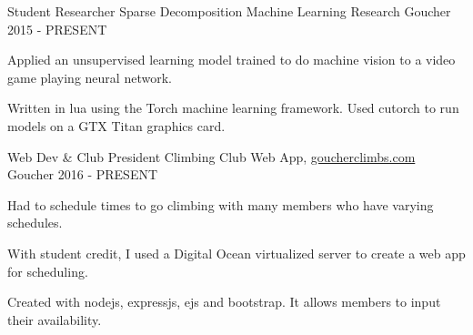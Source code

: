 

\begin{cventries}

  \cventry
    {Student Researcher} %
    {Sparse Decomposition Machine Learning Research} %
    {Goucher} %
    {2015 - PRESENT} %
    {
      \begin{cvitems} %
        \item {Applied an unsupervised learning model trained to do machine vision to a video game playing neural network.}
        \item {Written in lua using the Torch machine learning framework. Used cutorch to run models on a GTX Titan graphics card.}
      \end{cvitems}
    }

  \cventry
    {Web Dev \& Club President} %
    {Climbing Club Web App{\normalfont, \href{http://www.goucherclimbs.com/}{goucherclimbs.com}} } %
    {Goucher} %
    {2016 - PRESENT} %
    {
      \begin{cvitems} %
        \item {Had to schedule times to go climbing with many members who have varying schedules.}
        \item {With student credit, I used a Digital Ocean virtualized server to create a web app for scheduling.}
        \item {Created with nodejs, expressjs, ejs and bootstrap. It allows members to input their availability.}
      \end{cvitems}
    }

\end{cventries}
